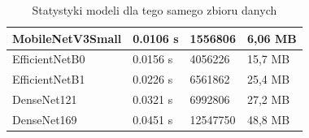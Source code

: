 \begin{table}[H]
\begin{tabular}{|l|l|l|l|}
		MobileNetV3Small & 0.0106 s                                                                                        & 1556806      & 6,06 MB                                                                                \\ \hline
		EfficientNetB0   & 0.0156 s                                                                                        & 4056226      & 15,7 MB                                                                                \\ \hline
		EfficientNetB1   & 0.0226 s                                                                                       & 6561862      & 25,4 MB                                                                                \\ \hline
		DenseNet121   & 0.0321 s                                                                                     & 6992806      & 27,2 MB                                                                               \\ \hline
		DenseNet169   & 0.0451 s                                                                                       & 12547750      & 48,8 MB                                                                                \\ \hline
	\end{tabular}
\caption{Statystyki modeli dla tego samego zbioru danych}
\label{tab:model_effectivnes}
\end{table}
